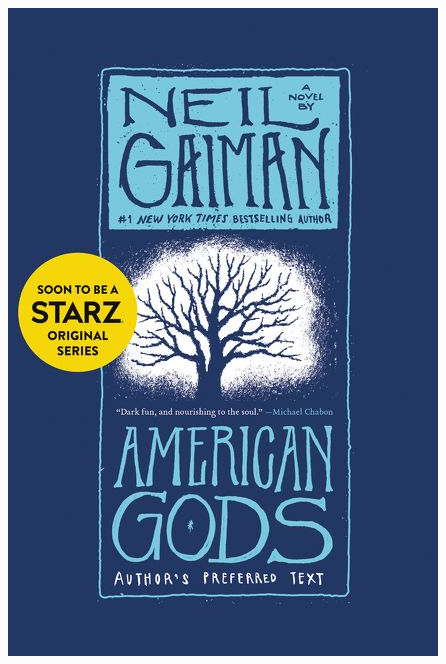 \documentclass{tufte-handout}
\makeatletter
\newcommand{\varcaption}[2][0pt]{%
  \gsetlength{\@tufte@caption@vertical@offset}{-#1}%
  \gdef\@tufte@stored@varcaption{#2}%
}
\gdef\@tufte@stored@varcaption{} %
\makeatother
\begin{document}
\begin{marginfigure}[-36\baselineskip]
   \includegraphics[width=\linewidth]{images/american_gods.jpg}
   \varcaption{\href{https://www.harpercollins.com/9780062080233/american-gods/}{Publisher Link}, \href{https://www.amazon.com/American-Gods-Novel-Neil-Gaiman/dp/0062572237/}{Amazon Link}}
\end{marginfigure}
\end{document}
